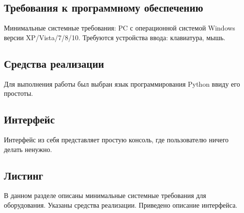 \documentclass[../main.tex]{subfiles}
\begin{document}
\subsection{Требования к программному обеспечению}

	Минимальные системные требования: PC с операционной системой Windows версии XP/Vista/7/8/10. Требуются устройства ввода: клавиатура, мышь. 
	
\subsection{Средства реализации}

	Для выполнения работы был выбран язык программирования Python ввиду его простоты.
	
\subsection{Интерфейс}

	 Интерфейс из себя представляет простую консоль, где пользователю ничего делать ненужно.
	 
\subsection{Листинг}
	
	
	
	
	
	В данном разделе описаны минимальные системные требования для оборудования. 
	Указаны средства реализации. 
	Приведено описание интерфейса.
	
\end{document}
